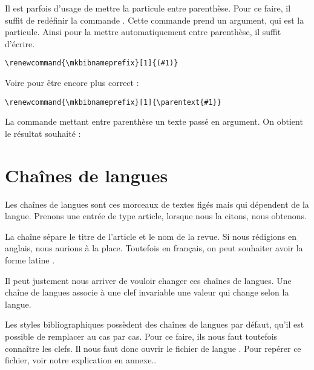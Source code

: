 Il est parfois d'usage de mettre la particule entre parenthèse. Pour ce faire, il suffit de redéfinir la commande . Cette commande prend un argument, qui est la particule. Ainsi pour la mettre automatiquement entre parenthèse, il suffit d'écrire.
	
	\begin{verbatim}
\renewcommand{\mkbibnameprefix}[1]{(#1)}
	\end{verbatim}
	
Voire pour être encore plus correct :
	
	\begin{verbatim}
\renewcommand{\mkbibnameprefix}[1]{\parentext{#1}}
	\end{verbatim}

La commande  mettant entre parenthèse un texte passé en argument. On obtient le résultat souhaité : 

	\begin{quotation}
	\cite{BeauvoirSexe}
	\end{quotation}

\section{Chaînes de langues}
	
	Les chaînes de langues sont ces morceaux de textes figés mais qui dépendent de la langue. Prenons une entrée de type article, lorsque nous la citons, nous obtenons.
	
	 
	 
	\begin{quotation}
		\cite{Junod1992}
	\end{quotation}
	
	La chaîne  sépare le titre de l'article et le nom de la revue. Si nous rédigions en anglais, nous aurions  à la place. Toutefois en français, on peut souhaiter avoir la forme latine . 
	
	Il peut justement nous arriver de vouloir changer ces chaînes de langues. Une chaîne de langues associe à une clef invariable une valeur qui change selon la langue.
	
	Les styles bibliographiques possèdent des chaînes de langues par défaut, qu'il est possible de remplacer au cas par cas. Pour ce faire, ils nous faut toutefois connaître les clefs. Il nous faut donc ouvrir le fichier de langue . Pour repérer ce fichier, voir notre explication en annexe..
	
